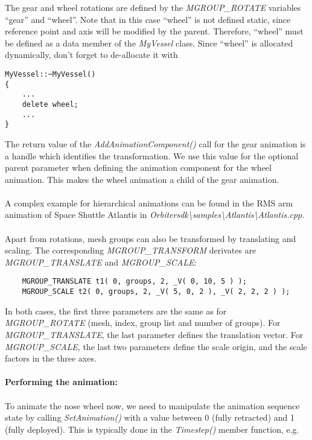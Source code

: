 \documentclass[Orbiter Developer Manual.tex]{subfiles}
\begin{document}
\noindent
The gear and wheel rotations are defined by the \textit{MGROUP\_ROTATE} variables “gear” and “wheel”. Note that in this case “wheel” is not defined static, since reference point and axis will be modified by the parent. Therefore, “wheel” must be defined as a data member of the \textit{MyVessel} class. Since “wheel” is allocated dynamically, don’t forget to de-allocate it with

\begin{lstlisting}
MyVessel::~MyVessel()
{
	...
	delete wheel;
	...
}
\end{lstlisting}

\noindent
The return value of the \textit{AddAnimationComponent()} call for the gear animation is a handle which identifies the transformation. We use this value for the optional parent parameter when defining the animation component for the wheel animation. This makes the wheel animation a child of the gear animation.\\
\\
A complex example for hierarchical animations can be found in the RMS arm animation of Space Shuttle Atlantis in \textit{Orbitersdk\textbackslash samples\textbackslash Atlantis\textbackslash Atlantis.cpp}.\\
\\
Apart from rotations, mesh groups can also be transformed by translating and scaling. The corresponding \textit{MGROUP\_TRANSFORM} derivates are \textit{MGROUP\_TRANSLATE} and \textit{MGROUP\_SCALE}:

\begin{lstlisting}
	MGROUP_TRANSLATE t1( 0, groups, 2, _V( 0, 10, 5 ) );
	MGROUP_SCALE t2( 0, groups, 2, _V( 5, 0, 2 ), _V( 2, 2, 2 ) );
\end{lstlisting}

\noindent
In both cases, the first three parameters are the same as for \textit{MGROUP\_ROTATE} (mesh, index, group list and number of groups). For \textit{MGROUP\_TRANSLATE}, the last parameter defines the translation vector. For \textit{MGROUP\_SCALE}, the last two parameters define the scale origin, and the scale factors in the three axes.\\
\\
\textbf{Performing the animation:}\\
\\
To animate the nose wheel now, we need to manipulate the animation sequence state by calling \textit{SetAnimation()} with a value between 0 (fully retracted) and 1 (fully deployed). This is typically done in the \textit{Timestep()} member function, e.g.
\end{document}
